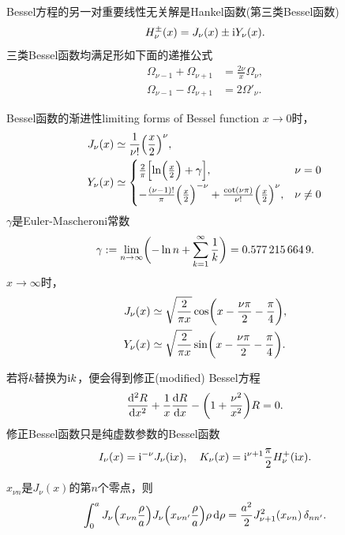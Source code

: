 Bessel方程的另一对重要线性无关解是Hankel函数(第三类Bessel函数)
\begin{equation}
    H_\nu^\pm(x)=J_\nu(x)\pm\i Y_\nu(x).
\end{equation}
三类Bessel函数均满足形如下面的递推公式
\begin{align*}
    \Omega_{\nu-1}+\Omega_{\nu+1}&=\frac{2\nu}x\Omega_\nu,\\
    \Omega_{\nu-1}-\Omega_{\nu+1}&=2\Omega'_\nu.
\end{align*}
\begin{example}{Bessel函数的渐进性}{limiting forms of Bessel function}
    $x\to 0$时， 
    \begin{align*}
        J_\nu(x)&\simeq\frac1{\nu!}\Bigkh{\frac x2}^\nu,\quad\\
        Y_\nu(x)&\simeq
        \begin{cases}
            \frac2\pi\Bigfkh{\ln\Bigkh{\frac x2}+\gamma},&\nu=0\\[1ex]
            -\frac{(\nu-1)!}\pi\Bigkh{\frac x2}^{-\nu}+\frac{\cot(\nu\pi)}{\nu!}\Bigkh{\frac x2}^\nu,&\nu\neq 0
        \end{cases}
    \end{align*}
    $\gamma$是Euler-Mascheroni常数
    \[
        \gamma:=\lim_{n\to\infty}\biggkh{-\ln n+\sum\fmto k1\frac1k}=\num{0.5772156649}.
    \]
    $x\to\infty$时， 
    \begin{align*}
        J_\nu(x)&\simeq\sqrt{\frac2{\pi x}}\cos\biggkh{x-\frac{\nu\pi}2-\frac\pi{4}},\\
        Y_\nu(x)&\simeq\sqrt{\frac2{\pi x}}\sin\biggkh{x-\frac{\nu\pi}2-\frac\pi{4}}.
    \end{align*}
\end{example}
若将$k$替换为$\i k$，便会得到修正(modified) Bessel方程
\[
    \dv[2]Rx+\frac1x\dv Rx-\biggkh{1+\frac{\nu^2}{x^2}}R=0.
\]
修正Bessel函数只是纯虚数参数的Bessel函数
\[
    I_\nu(x)=\i^{-\nu}J_\nu(\i x),\quad K_\nu(x)=\i^{\nu+1}\frac\pi 2H_\nu^+(\i x).
\]
\begin{theorem}{}{}
    $x_{\nu n}$是$J_\nu(x)$的第$n$个零点，则
    \begin{equation}
        \int_0^a J_\nu\Bigkh{x_{\nu n}\frac\rho a}J_\nu\Bigkh{x_{\nu n'}\frac\rho a}\rho\d\rho=\frac{a^2}2J_{\nu+1}^2(x_{\nu n})\vd_{nn'}.
    \end{equation}
\end{theorem}

